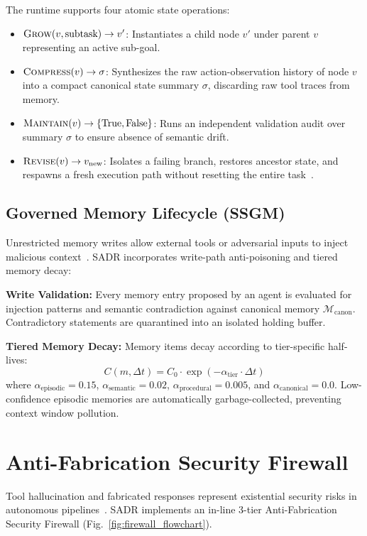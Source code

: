 \documentclass[10pt,journal,compsoc]{IEEEtran}
\begin{document}
The runtime supports four atomic state operations:
\begin{itemize}
    \item $\textsc{Grow}(v, \text{subtask}) \to v'$: Instantiates a child node $v'$ under parent $v$ representing an active sub-goal.
    \item $\textsc{Compress}(v) \to \sigma$: Synthesizes the raw action-observation history of node $v$ into a compact canonical state summary $\sigma$, discarding raw tool traces from memory.
    \item $\textsc{Maintain}(v) \to \{\text{True}, \text{False}\}$: Runs an independent validation audit over summary $\sigma$ to ensure absence of semantic drift.
    \item $\textsc{Revise}(v) \to v_{\text{new}}$: Isolates a failing branch, restores ancestor state, and respawns a fresh execution path without resetting the entire task~\cite{zheng2026rewind}.
\end{itemize}

\subsection{Governed Memory Lifecycle (SSGM)}
Unrestricted memory writes allow external tools or adversarial inputs to inject malicious context~\cite{lam2026ssgm, bousetouane2026acc}. SADR incorporates write-path anti-poisoning and tiered memory decay:

\textbf{Write Validation:} Every memory entry proposed by an agent is evaluated for injection patterns and semantic contradiction against canonical memory $\mathcal{M}_{\text{canon}}$. Contradictory statements are quarantined into an isolated holding buffer.

\textbf{Tiered Memory Decay:} Memory items decay according to tier-specific half-lives:
\begin{equation}
C(m, \Delta t) = C_0 \cdot \exp(-\alpha_{\text{tier}} \cdot \Delta t)
\end{equation}
where $\alpha_{\text{episodic}} = 0.15$, $\alpha_{\text{semantic}} = 0.02$, $\alpha_{\text{procedural}} = 0.005$, and $\alpha_{\text{canonical}} = 0.0$. Low-confidence episodic memories are automatically garbage-collected, preventing context window pollution.


\section{Anti-Fabrication Security Firewall}
Tool hallucination and fabricated responses represent existential security risks in autonomous pipelines~\cite{deng2026autopilot, huang2023survey_hallucination, ji2023survey_hallucination}. SADR implements an in-line 3-tier Anti-Fabrication Security Firewall (Fig.~\ref{fig:firewall_flowchart}).
\end{document}
